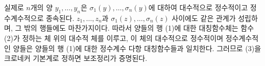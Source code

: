 
실제로 $n$개의 양 $y_1,\ldots,y_n$은 $\sigma_1(y),\ldots,\sigma_n(y)$에 대하여 대수적으로 정수적이고 정수계수적으로 종속된다. $z_1,\ldots,z_n$과 $\sigma_1(z),\ldots,\sigma_n(z)$ 사이에도 같은 관계가 성립하며, 그 밖의 행들에도 마찬가지이다. 따라서 양들의 행 (1)에 대한 대칭함수체는 함수 (2)가 정하는 체 위의 대수적 체를 이루고, 이 체의 대수적으로 정수적이며 정수계수적인 양들은 양들의 행 (1)에 대한 정수계수 다항 대칭함수들과 일치한다. 그러므로 (3)을 크로네커 기본계로 정하면 보조정리가 증명된다.
